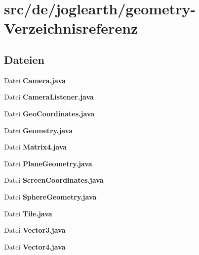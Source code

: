 \section{src/de/joglearth/geometry-\/\-Verzeichnisreferenz}
\label{dir_c0ff63119d263ea4d1c46a9b982d5c97}
\subsection*{Dateien}
\begin{DoxyCompactItemize}
\item 
Datei {\bfseries Camera.\-java}
\item 
Datei {\bfseries Camera\-Listener.\-java}
\item 
Datei {\bfseries Geo\-Coordinates.\-java}
\item 
Datei {\bfseries Geometry.\-java}
\item 
Datei {\bfseries Matrix4.\-java}
\item 
Datei {\bfseries Plane\-Geometry.\-java}
\item 
Datei {\bfseries Screen\-Coordinates.\-java}
\item 
Datei {\bfseries Sphere\-Geometry.\-java}
\item 
Datei {\bfseries Tile.\-java}
\item 
Datei {\bfseries Vector3.\-java}
\item 
Datei {\bfseries Vector4.\-java}
\end{DoxyCompactItemize}
